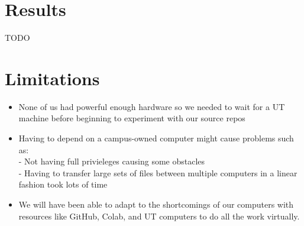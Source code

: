 \documentclass{article}
\begin{document}
\section{Results}
TODO

\section{Limitations}
\begin{itemize}
    \item None of us had powerful enough hardware so we needed to wait for a UT machine before beginning to experiment with our source repos
    \item Having to depend on a campus-owned computer might cause problems such as: \\
        - Not having full privieleges causing some obstacles \\
        - Having to transfer large sets of files between multiple computers in a linear fashion took lots of time
    \item We will have been able to adapt to the shortcomings of our computers with resources like GitHub, Colab, and UT computers to do all the work virtually.
\end{itemize}




\end{document}
